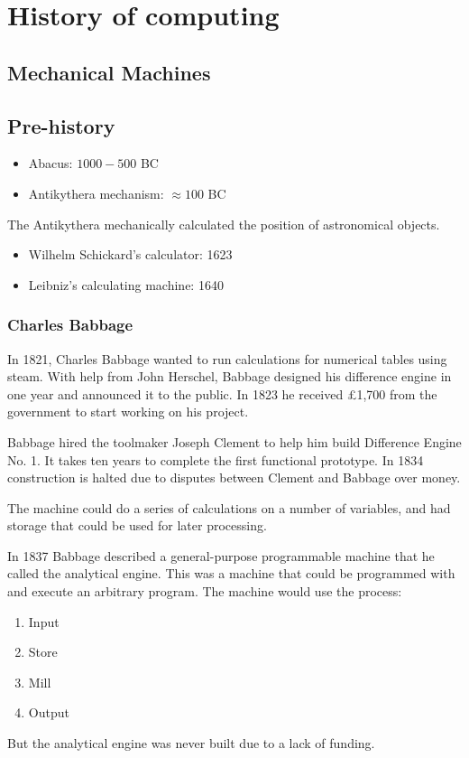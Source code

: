 \chapter{History of computing}

\section{Mechanical Machines}
\section{Pre-history}
\begin{itemize}
    \item Abacus: \(1000 - 500\) BC
    \item Antikythera mechanism: \(\approx100\) BC
\end{itemize}
The Antikythera mechanically calculated the position of astronomical objects.
\begin{itemize}
    \item Wilhelm Schickard's calculator: 1623
    \item Leibniz's calculating machine: 1640
\end{itemize}

\subsection{Charles Babbage}
In 1821, Charles Babbage wanted to run calculations for numerical tables using steam. With help from John Herschel, Babbage designed his difference engine in one year and announced it to the public. In 1823 he received £1,700 from the government to start working on his project.

Babbage hired the toolmaker Joseph Clement to help him build Difference Engine No. 1. It takes ten years to complete the first functional prototype. In 1834 construction is halted due to disputes between Clement and Babbage over money.

The machine could do a series of calculations on a number of variables, and had storage that could be used for later processing.

In 1837 Babbage described a general-purpose programmable machine that he called the analytical engine. This was a machine that could be programmed with and execute an arbitrary program. The machine would use the process:
\begin{enumerate}
    \item Input
    \item Store
    \item Mill
    \item Output
\end{enumerate}
But the analytical engine was never built due to a lack of funding.

